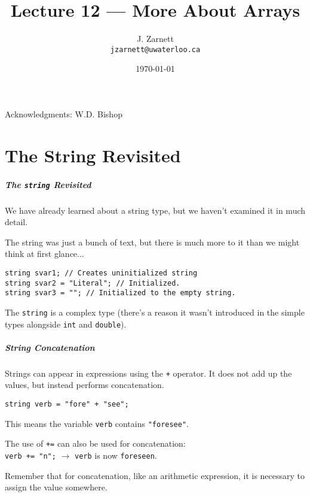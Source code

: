 

\title{Lecture 12 --- More About Arrays }

\author{J. Zarnett\\
\texttt{jzarnett@uwaterloo.ca}}
\date{\today}



\begin{frame}
  \titlepage
  
  \begin{center}
  \small{Acknowledgments: W.D. Bishop}
  \end{center}
 \end{frame}
 
\part{The String Revisited}
\begin{frame}
\partpage
\end{frame} 
 
\begin{frame}
\frametitle{The \texttt{string} Revisited}

We have already learned about a string type, but we haven't examined it in much detail.

The string was just a bunch of text, but there is much more to it than we might think at first glance...

\texttt{string svar1; // Creates uninitialized string}\\
\texttt{string svar2 = "Literal"; // Initialized.}\\
\texttt{string svar3 = ""; // Initialized to the empty string.}

The \texttt{string} is a complex type (there's a reason it wasn't introduced in the simple types alongside \texttt{int} and \texttt{double}).

\end{frame}

\begin{frame}
\frametitle{String Concatenation}

Strings can appear in expressions using the \texttt{+} operator. It does not add up the values, but instead performs \alert{concatenation}.

\texttt{string verb = "fore" + "see";}

This means the variable \texttt{verb} contains \texttt{"foresee"}.

The use of \texttt{+=} can also be used for concatenation:\\
\quad \texttt{verb += "n";} $\rightarrow$ \texttt{verb} is now \texttt{foreseen}.

Remember that for concatenation, like an arithmetic expression, it is necessary to assign the value somewhere.

\end{frame}

